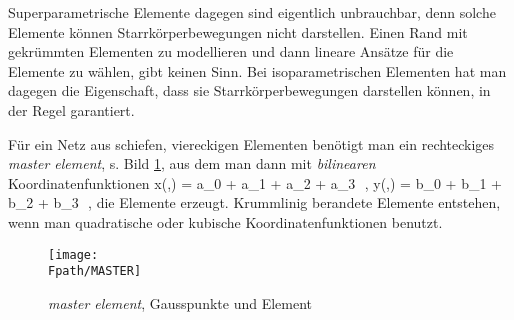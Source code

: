 {Superparametrische Elemente dagegen sind eigentlich unbrauchbar, denn solche Elemente
k\"{o}nnen Starrk\"{o}rperbewegungen nicht darstellen. Einen Rand mit gekr\"{u}mmten Elementen zu
modellieren und dann lineare Ans\"{a}tze f\"{u}r die Elemente zu w\"{a}hlen, gibt keinen Sinn. Bei
isoparametrischen Elementen hat man dagegen die Eigenschaft, dass sie
Starrk\"{o}rperbewegungen darstellen k\"{o}nnen, in der Regel garantiert.

F\"{u}r ein Netz aus schiefen, viereckigen Elementen ben\"{o}tigt man ein rechteckiges {\em
master element\/}, s. Bild \ref{Master}, aus dem man dann mit {\em
bilinearen\/} Koordinatenfunktionen
\bfoo
x(\xi,\eta) = a_0 + a_1 \xi + a_2 \eta + a_3 \xi \,\eta\,,  \qquad y(\xi,\eta) = b_0 +
b_1 \xi + b_2 \eta + b_3 \xi \,\eta\,,
\efoo
die Elemente erzeugt. Krummlinig berandete Elemente entstehen, wenn man quadratische
oder kubische Koordinatenfunktionen benutzt.

\begin{figure}[tbp]
\if {} \sidecaption \fi
\texttt{[image: \\Fpath/MASTER]}
\caption{{\em master element\/}, Gausspunkte und Element} \label{Master}
\end{figure}%

}
